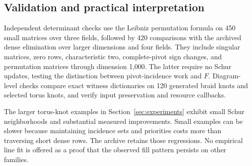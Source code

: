 \subsection{Validation and practical interpretation}

Independent determinant checks use the Leibniz permutation formula on 450
small matrices over three fields, followed by 420 comparisons with the
archived dense elimination over larger dimensions and four fields.  They
include singular matrices, zero rows, characteristic two, complete-pivot
sign changes, and permutation matrices through dimension 1,000.  The latter
require no Schur updates, testing the distinction between pivot-incidence
work and $F$.  Diagram-level checks compare exact witness dictionaries on
120 generated braid knots and selected torus knots, and verify input
preservation and resource callbacks.

The larger torus-knot examples in Section~\ref{sec:experiments} exhibit small
Schur neighborhoods and substantial measured improvements.  Small examples
can be slower because maintaining incidence sets and priorities costs more
than traversing short dense rows.  The archive retains those regressions.
No empirical line fit is offered as a proof that the observed fill pattern
persists on other families.
